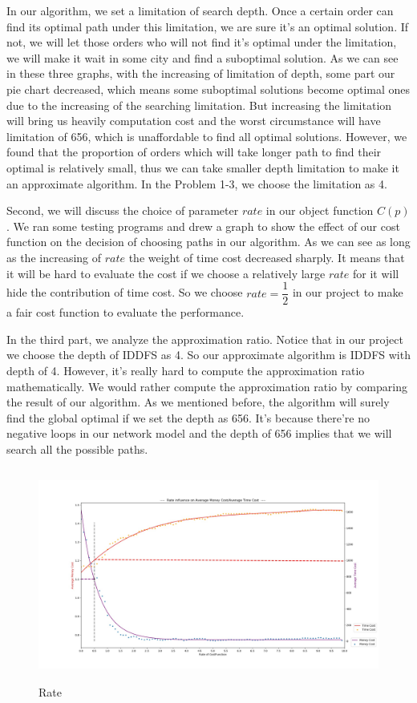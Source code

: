 \documentclass{llncs}
\begin{document}
In our algorithm, we set a limitation of search depth. Once a certain order can find its optimal path under this limitation, we are sure it's an optimal solution. If not, we will let those 
orders who will not find it's optimal under the limitation, we will make it wait in some city and find a suboptimal solution.
As we can see in these three graphs, with the increasing of limitation of depth, some part our pie chart decreased, which means some suboptimal solutions become optimal ones due to the increasing 
of the searching limitation. But increasing the limitation will bring us heavily computation cost and the worst circumstance will have limitation of 656, which is unaffordable to find all optimal solutions.
However, we found that the proportion of orders which will take longer path to find their optimal is relatively small, thus we can take smaller depth limitation to make it an approximate algorithm. In the Problem 1-3, we choose the limitation as 4.\par

Second, we will discuss the choice of parameter $rate$ in our object function $C(p)$. We ran some testing programs and drew a graph to show the effect of our cost function on the decision of choosing paths in our algorithm.
As we can see as long as the increasing of $rate$ the weight of time cost decreased sharply. It means that it will be hard to evaluate the cost if we choose a relatively large $rate$ for it will hide the contribution of time cost.
So we choose $rate=\dfrac{1}{2}$ in our project to make a fair cost function to evaluate the performance.

In the third part, we analyze the approximation ratio. Notice that in our project we choose the depth of IDDFS as 4. So our approximate algorithm is IDDFS with depth of 4.
However, it's really hard to compute the approximation ratio mathematically. We would rather compute the approximation ratio by comparing the result of our algorithm. As we 
mentioned before, the algorithm will surely find the global optimal if we set the depth as 656. It's because there're no negative loops in our network model and the depth of 656 implies that we will search all the 
possible paths. 
\begin{figure}[htbp]
  \centering
  \includegraphics[height = 7cm]{graph/Rate.jpg}
  \caption{Rate}
  \label{fig:rt}
\end{figure}
\end{document}
